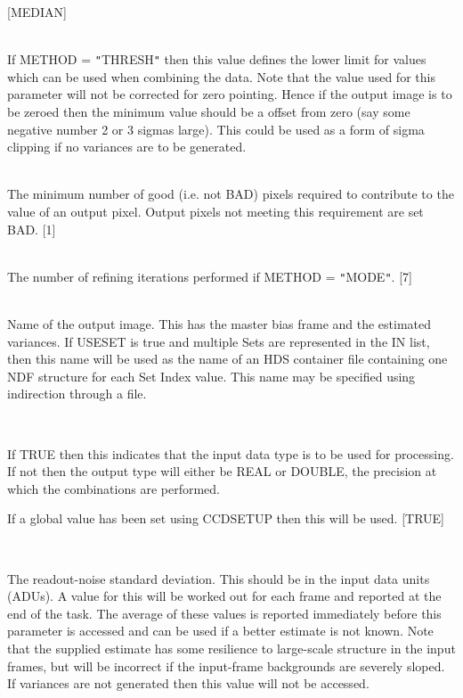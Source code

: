 \documentclass[twoside,11pt]{article}
\newcommand{\htmlref}[2]{#1}
\renewcommand{\_}{\texttt{\symbol{95}}}
\newcommand{\qt}[1]{{\tt "}#1{\tt "}}
\newcommand{\xroutine}[1]{\htmlref{{\sc #1}}{#1}}
\newcommand{\sstsubsection}[1]{ \item[{#1}] \mbox{} \\}
\newcommand{\sstsubsection}[1]{\item[{#1}]}
\begin{document}
{{{{            [MEDIAN]
         }
      }
      \sstsubsection{
         MIN = \_REAL (Read)
      } {
         If METHOD = \qt{THRESH} then this value defines the lower limit
         for values which can be used when combining the data. Note that
         the value used for this parameter will not be corrected for zero
         pointing. Hence if the output image is to be zeroed then the
         minimum value should be a offset from zero (say some negative
         number 2 or 3 sigmas large). This could be used as a form of
         sigma clipping if no variances are to be generated.
      }
      \sstsubsection{
         MINPIX = \_INTEGER (Read)
      } {
         The minimum number of good (i.e. not BAD) pixels required
         to contribute to the value of an output pixel. Output pixels
         not meeting this requirement are set BAD.
         [1]
      }
      \sstsubsection{
         NITER = \_INTEGER (Read)
      } {
         The number of refining iterations performed if METHOD = \qt{MODE}.
         [7]
      }
      \sstsubsection{
         OUT = LITERAL (Read)
      } {
         Name of the output image. This has the master bias frame and
         the estimated variances.  If USESET is true and multiple Sets
         are represented in the IN list, then this name will be used
         as the name of an HDS container file containing one NDF structure for
         each Set Index value.  
         This name may be specified using indirection through a file.
      }
      \sstsubsection{
         PRESERVE = \_LOGICAL (Read)
      } {
         If TRUE then this indicates that the input data type is to be
         used for processing. If not then the output type will either
         be \_REAL or \_DOUBLE, the precision at which the combinations
         are performed.

         If a global value has been set using \xroutine{CCDSETUP} then this will
         be used.
         [TRUE]
      }
      \sstsubsection{
         RNOISE = \_DOUBLE (Read)
      } {
         The readout-noise standard deviation. This should be in the
         input data units (ADUs). A value for this will be worked out
         for each frame and reported at the end of the task. The
         average of these values is reported immediately before this
         parameter is accessed and can be used if a better estimate is
         not known. Note that the supplied estimate has some resilience
         to large-scale structure in the input frames, but will be
         incorrect if the input-frame backgrounds are severely sloped.
         If variances are not generated then this value will not be
         accessed.

}}}
\end{document}
